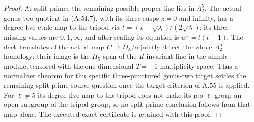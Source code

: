 \begin{proof}
At split primes the remaining possible proper line lies in
\(A_2^5\). The actual genus-two quotient in (A.54.7), with
its three cusps \(z=0\) and infinity, has a degree-five etale
map to the tripod via
\(t=(x+\sqrt\lambda)/(2\sqrt\lambda)\): its three missing
values are \(0,1,\infty\), and after scaling its equation is
\(w^5=t(t-1)\). The deck translates of the actual map
\(C\to D_\lambda/\sigma\) jointly detect the whole
\(A_2^5\) homology: their image is the \(H_5\)-span of the
\(H\)-invariant line in the simple module, tensored with the
one-dimensional \(T=-1\) multiplicity space. Thus a normalizer
theorem for this specific three-punctured genus-two target
settles the remaining split-prime source question once the target
criterion of A.55 is applied.
For \(\ell\ne5\) its degree-five map to the tripod does not
make its pro-\(\ell\) group an open subgroup of the tripod
group, so no split-prime conclusion follows from that map alone.
The executed exact certificate is retained with this proof.
\end{proof}
